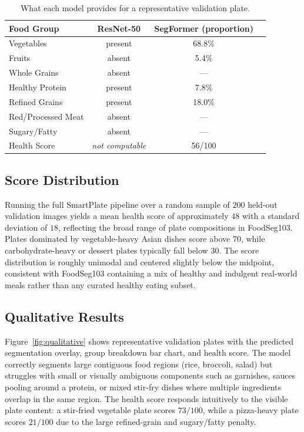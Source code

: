 \begin{table}[h]
\centering
\caption{What each model provides for a representative validation plate.}
\label{tab:comparison}
\begin{tabular}{lccc}
\toprule
Food Group & ResNet-50 & SegFormer (proportion) \\
\midrule
Vegetables         & present & 68.8\% \\
Fruits             & absent  & 5.4\%  \\
Whole Grains       & absent  & ---    \\
Healthy Protein    & present & 7.8\%  \\
Refined Grains     & present & 18.0\% \\
Red/Processed Meat & absent  & ---    \\
Sugary/Fatty       & absent  & ---    \\
\midrule
Health Score       & \emph{not computable} & 56/100 \\
\bottomrule
\end{tabular}
\end{table}

\subsection{Score Distribution}

Running the full SmartPlate pipeline over a random sample of $200$ held-out validation images yields a mean health score of approximately $48$ with a standard deviation of $18$, reflecting the broad range of plate compositions in FoodSeg103.
Plates dominated by vegetable-heavy Asian dishes score above $70$, while carbohydrate-heavy or dessert plates typically fall below $30$.
The score distribution is roughly unimodal and centered slightly below the midpoint, consistent with FoodSeg103 containing a mix of healthy and indulgent real-world meals rather than any curated healthy eating subset.

\subsection{Qualitative Results}

Figure~\ref{fig:qualitative} shows representative validation plates with the predicted segmentation overlay, group breakdown bar chart, and health score.
The model correctly segments large contiguous food regions (rice, broccoli, salad) but struggles with small or visually ambiguous components such as garnishes, sauces pooling around a protein, or mixed stir-fry dishes where multiple ingredients overlap in the same region.
The health score responds intuitively to the visible plate content: a stir-fried vegetable plate scores $73/100$, while a pizza-heavy plate scores $21/100$ due to the large refined-grain and sugary/fatty penalty.

